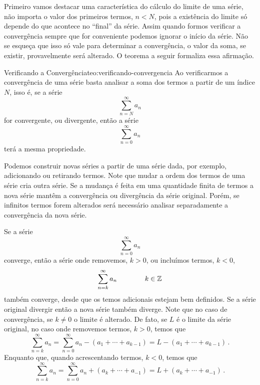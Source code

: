 Primeiro vamos destacar uma característica do cálculo do limite de uma série,
não importa o valor dos primeiros termos, $n<N$, pois a existência do limite só
depende do que acontece no ``final'' da série. Assim quando formos verificar
a convergência sempre que for conveniente podemos ignorar o início da série.
Não se esqueça que isso só vale para determinar a convergência, o valor da
soma, se existir, provavelmente será alterado. O teorema a seguir formaliza
essa afirmação.

\begin{teorema}{Verificando a Convergência}{teo:verificando-convergencia}
  Ao verificarmos a convergência de uma série basta analisar a soma dos
  termos a partir de um índice $N$, isso é, se a série
  \[
    \sum_{n=N}^\infty a_n
  \]
  for convergente, ou divergente, então a série
  \[
    \sum_{n=0}^\infty a_n
  \]
  terá a mesma propriedade.
\end{teorema}

Podemos construir novas séries a partir de uma série dada, por exemplo,
adicionando ou retirando termos. Note que mudar a ordem dos termos de uma série
cria outra série. Se a mudança é feita em uma quantidade finita de termos
a nova série mantêm a convergência ou divergência da série original.
Porém, se infinitos termos forem alterados será necessário
analisar separadamente a convergência da nova série.

Se a série
\[
  \sum_{n=0}^\infty a_n
\]
converge, então a série onde removemos, $k>0$, ou incluímos termos, $k<0$,
\[
  \sum_{n=k}^\infty a_n \qquad\qquad k\in \mathbb{Z}
\]
também converge, desde que os temos adicionais estejam bem definidos.
Se a série original divergir então a nova série também diverge.
Note que no caso de convergência, se $k\neq 0$ o limite é alterado.
De fato, se $L$ é o limite da série original,
no caso onde removemos termos, $k>0$, temos que
\[
  \sum_{n=k}^\infty a_n
  = \sum_{n=0}^\infty a_n - \left(a_1+\cdots+a_{k-1} \right)
  = L - \left(a_1+\cdots+a_{k-1}\right)                     \,.
\]
Enquanto que, quando acrescentando termos, $k<0$, temos que
\[
  \sum_{n=k}^\infty a_n
  = \sum_{n=0}^\infty a_n + \left( a_k+\cdots+a_{-1} \right)
  = L + \left( a_k+\cdots+a_{-1} \right)        \,.
\]


